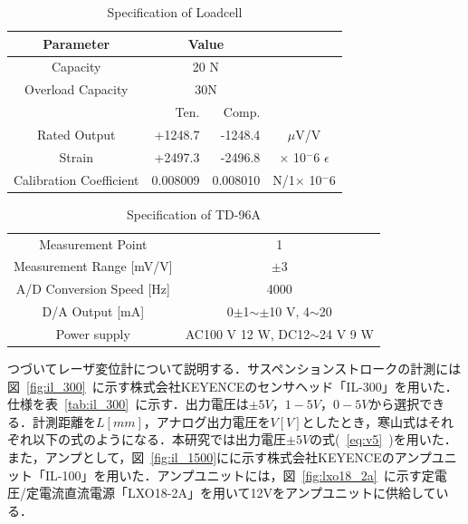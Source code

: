 \documentclass[a4paper,12pt]{article_vdlab_sotsuron}
\begin{document}
\vspace*{10mm}
\begin{table}[h]
  \begin{center}
    \caption{Specification of Loadcell}
	\label{tab:tclz_20na}
	\begin{tabular}{crrc}\hline
	  Parameter & \multicolumn{2}{c}{Value}&\\\hline
	  Capacity & \multicolumn{2}{c}{20 N}&\\
	  Overload Capacity & \multicolumn{2}{c}{30N}&\\
	    & Ten.&Comp.\\
	  Rated Output & +1248.7 & -1248.4 & $\mu$V/V \\
	  Strain & +2497.3 & -2496.8 & $\times$ 10$^-6$ $\epsilon$ \\
	  Calibration Coefficient & 0.008009 & 0.008010 & N/1$\times$ 10$^-6$ \\\hline
	\end{tabular}
  \end{center}
\end{table}

\vspace*{10mm}
\begin{table}[h]
  \begin{center}
    \caption{Specification of TD-96A}
    \label{tab:td_96a}
    \begin{tabular}{cc}\hline
      Measurement Point & 1 \\
      Measurement Range [mV/V]& $\pm$3\\
      A/D Conversion Speed [Hz]& 4000\\
      D/A Output [mA]& 0$\pm$1$\sim\pm$10 V, 4$\sim$20\\
      Power supply & AC100 V 12 W, DC12$\sim$24 V 9 W \\\hline
    \end{tabular}
  \end{center}
\end{table}

\newpage
つづいてレーザ変位計について説明する．サスペンションストロークの計測には図~\ref{fig:il_300}~に示す株式会社KEYENCEのセンサヘッド「IL-300」を用いた．仕様を表~\ref{tab:il_300}~に示す．出力電圧は$\pm 5V，1-5V，0-5V$から選択できる．計測距離を$L[mm]$，アナログ出力電圧を$V[V]$としたとき，寒山式はそれぞれ以下の式のようになる．本研究では出力電圧$\pm 5V$の式(~\ref{eq:v5}~)を用いた．また，アンプとして，図~\ref{fig:il_1500}にに示す株式会社KEYENCEのアンプユニット「IL-100」を用いた．アンプユニットには，図~\ref{fig:lxo18_2a}~に示す定電圧/定電流直流電源「LXO18-2A」を用いて12Vをアンプユニットに供給している．
\end{document}
